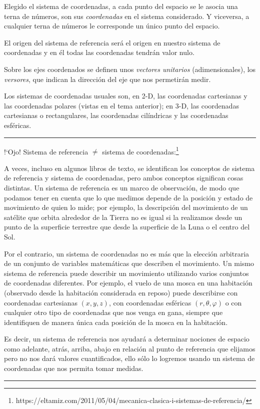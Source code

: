 Elegido el sistema de coordenadas, a cada punto del espacio se le asocia una terna de números, son sus \emph{coordenadas} en el sistema considerado. Y viceversa, a cualquier terna de números le corresponde un único punto del espacio.

El origen del sistema de referencia será el origen en nuestro sistema de coordenadas y en él todas las coordenadas tendrán valor nulo.

Sobre los ejes coordenados se definen unos \emph{vectores unitarios} (adimensionales), los \emph{versores}, que indican la dirección del eje que nos permetirán medir.


Los sistemas de coordenadas usuales son, en 2-D, las coordenadas cartesianas y las coordenadas polares (vistas en el tema anterior); en 3-D, las coordenadas cartesianas o rectangulares, las coordenadas cilíndricas y las coordenadas esféricas.

\vspace{1cm}
\color{teal}
\rule{250pt}{0.2pt}	

!`Ojo! Sistema de referencia $\neq$ sistema de coordenadas:\footnote{\textcolor{NavyBlue}{https://eltamiz.com/2011/05/04/mecanica-clasica-i-sistemas-de-referencia/}}

A veces, incluso en algunos libros de texto, se identifican los conceptos de sistema de referencia y sistema de coordenadas, pero ambos conceptos significan cosas distintas. Un sistema de referencia es un marco de observación, de modo que podamos tener en cuenta que lo que medimos depende de la posición y estado de movimiento de quien lo mide; por ejemplo, la descripción del movimiento de un satélite que orbita alrededor de la Tierra no es igual si la realizamos desde un punto de la superficie terrestre que desde la superficie de la Luna o el centro del Sol.

Por el contrario, un sistema de coordenadas no es más que la elección arbitraria de un conjunto de variables matemáticas que describen el movimiento. Un mismo sistema de referencia puede describir un movimiento utilizando varios conjuntos de coordenadas diferentes. Por ejemplo, el vuelo de una mosca en una habitación (observado desde la habitación considerada en reposo) puede describirse con coordenadas cartesianas $(x,y,z)$, con coordenadas esféricas $(r,\theta,\varphi)$ o con cualquier otro tipo de coordenadas que nos venga en gana, siempre que identifiquen de manera única cada posición de la mosca en la habitación.

Es decir, un sistema de referencia nos ayudará a determinar nociones de espacio como adelante, atrás, arriba, abajo en relación al punto de referencia que elijamos pero no nos dará valores cuantificados, ello sólo lo logremos usando un sistema de coordenadas que nos permita tomar medidas.
\begin{flushright}
\rule{250pt}{0.2pt}		
\end{flushright}

